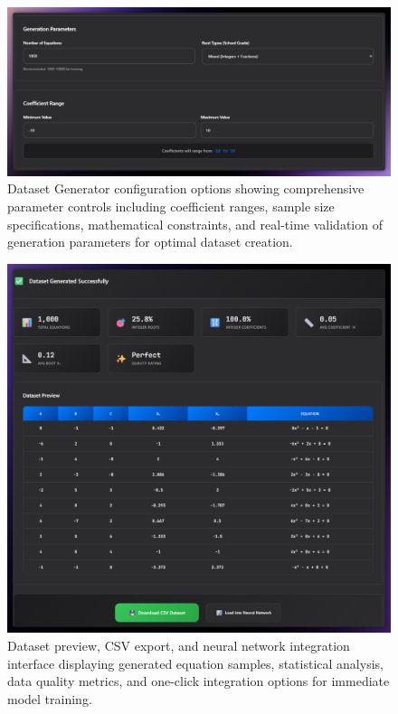 \documentclass[11pt,a4paper]{report}
\begin{document}
\begin{figure}[H]
\centering
\includegraphics[width=\textwidth]{quadratic_predictor_generator_config.png}
\caption{Dataset Generator configuration options showing comprehensive parameter controls including coefficient ranges, sample size specifications, mathematical constraints, and real-time validation of generation parameters for optimal dataset creation.}
\label{fig:quadratic_generator_config}
\end{figure}

\begin{figure}[H]
\centering
\includegraphics[width=\textwidth]{quadratic_predictor_dataset_preview.png}
\caption{Dataset preview, CSV export, and neural network integration interface displaying generated equation samples, statistical analysis, data quality metrics, and one-click integration options for immediate model training.}
\label{fig:quadratic_dataset_preview}
\end{figure}
\end{document}
